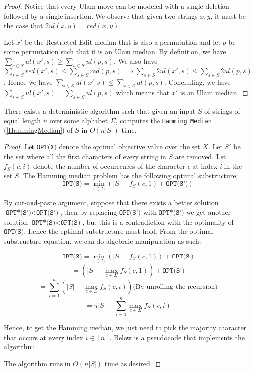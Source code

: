 \begin{proof}
    Notice that every Ulam move can be modeled with a single deletion followed by a single insertion. We observe that given two strings $x, y$, it must be the case that $2 ul(x, y) = red(x, y)$.

    Let $x'$ be the Restricted Edit median that is also a permutation and let $p$ be some permutation such that it is an Ulam median. By definition, we have $\sum\limits_{s \in S} ul(x', s) \geq \sum\limits_{s \in S} ul(p, s)$. We also have $\sum\limits_{s \in S} red(x', s) \leq \sum\limits_{s \in S} red(p, s) \implies \sum\limits_{s \in S} 2 ul(x', s) \leq \sum\limits_{s \in S} 2 ul(p, s)$. Hence we have $\sum\limits_{s \in S} ul(x', s) \leq \sum\limits_{s \in S} ul(p, s)$. Concluding, we have $\sum\limits_{s \in S} ul(x', s) = \sum\limits_{s \in S} ul(p, s)$ which means that $x'$ is an Ulam median.
\end{proof}

\begin{theorem}
\label{Median Hamming}
    There exists a deterministic algorithm such that given an input $S$ of strings of equal length $n$ over some alphabet $\Sigma$, computes the \texttt{Hamming Median} (\ref{HammingMedian}) of $S$ in $O(n |S|)$ time.
\end{theorem}

\begin{proof}
    Let $\texttt{OPT(X)}$ denote the optimal objective value over the set $X$. Let $S'$ be the set where all the first characters of every string in $S$ are removed. Let $f_S(c, i)$ denote the number of occurrences of the character $c$ at index $i$ in the set $S$. The Hamming median problem has the following optimal substructure:
    \[\texttt{OPT(S)} = \min_{c \in \Sigma}\left(|S| -  f_S(c, 1) + \texttt{OPT(S')}\right)\]

    By cut-and-paste argument, suppose that there exists a better solution $\texttt{OPT*(S')} < \texttt{OPT(S')}$, then by replacing $\texttt{OPT(S')}$ with $\texttt{OPT*(S')}$ we get another solution $\texttt{OPT*(S)} < \texttt{OPT(S)}$, but this is a contradiction with the optimality of $\texttt{OPT(S)}$. Hence the optimal substructure must hold. From the optimal substructure equation, we can do algebraic manipulation as such:

    \[\texttt{OPT(S)} = \min_{c \in \Sigma}\left(|S| -  f_S(c, 1)\right) + \texttt{OPT(S')}\]
    \[= \left(|S| - \max_{c \in \Sigma} f_S(c, 1)\right) + \texttt{OPT(S')}\]
    \[= \sum_{i = 1}^n \left(|S| - \max_{c \in \Sigma} f_S(c, i)\right) \text{(By unrolling the recursion)}\]
    \[= n|S| - \sum_{i = 1}^n \max_{c \in \Sigma} f_S(c, i)\]

    Hence, to get the Hamming median, we just need to pick the majority character that occurs at every index $i \in [n]$. Below is a pseudocode that implements the algorithm:
    
    

    The algorithm runs in $O(n|S|)$ time as desired.
\end{proof}

